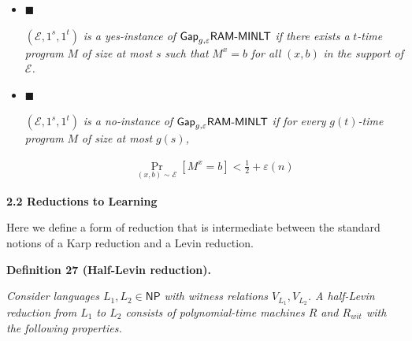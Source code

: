 \begin{itemize}


\item[] 
$\blacksquare$ 


$(\mathcal{E},1^{s},1^{t})$\emph{ is a yes-instance of }${\sf Gap}_{g,\varepsilon}{\sf RAM}\text{-}{\sf MINLT}$\emph{ if there exists a }$t$\emph{-time program }$M$\emph{ of size at most }$s$\emph{ such that }$M^{x}=b$\emph{ for all }$(x,b)$\emph{ in the support of }$\mathcal{E}$\emph{.}\par





\item[] 
$\blacksquare$ 


$(\mathcal{E},1^{s},1^{t})$\emph{ is a no-instance of }${\sf Gap}_{g,\varepsilon}{\sf RAM}\text{-}{\sf MINLT}$\emph{ if for every }$g(t)$\emph{-time program }$M$\emph{ of size at most }$g(s)$\emph{,}\par


\[\begin{gathered}
\Pr_{(x,b)\sim\mathcal{E}}[M^{x}=b]<\frac{1}{2}+\varepsilon(n)
\end{gathered}\]





\end{itemize}







\par\medskip\noindent\textbf{
2.2 Reductions to Learning}\par




Here we define a form of reduction that is intermediate between the standard notions of a Karp reduction and a Levin reduction.\par





\par\medskip\noindent\textbf{
\textbf{Definition 27}\textbf{ }(Half-Levin reduction)\textbf{.}
}\par



\emph{Consider languages $L_{1},L_{2}\in{\mathsf{NP}}$ with witness relations $V_{L_{1}},V_{L_{2}}$. A half-Levin reduction from $L_{1}$ to $L_{2}$ consists of polynomial-time machines $R$ and $R_{wit}$ with the following properties.}\par


